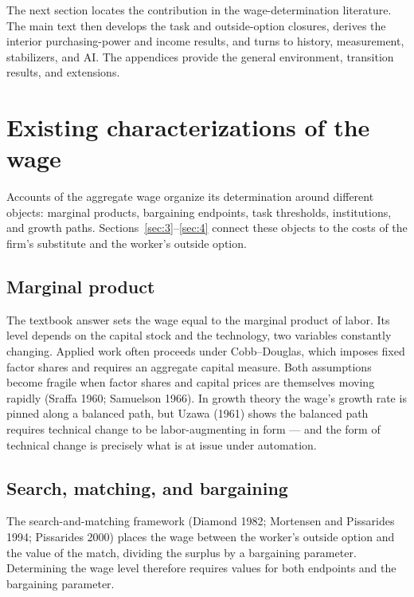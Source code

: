 \documentclass[12pt]{article}
\theoremstyle{plain}
\begin{document}
The next section locates the contribution in the wage-determination
literature. The main text then develops the task and outside-option closures,
derives the interior purchasing-power and income results, and turns to history,
measurement, stabilizers, and AI. The appendices provide the general
environment, transition results, and extensions.

\section{Existing characterizations of the wage}\label{sec:2}

Accounts of the aggregate wage organize its determination around different objects: marginal products, bargaining endpoints, task thresholds, institutions, and growth paths. Sections~\ref{sec:3}--\ref{sec:4} connect these objects to the costs of the firm's substitute and the worker's outside option.

\subsection{Marginal product}\label{sec:2.1}

The textbook answer sets the wage equal to the marginal product of labor. Its level depends on the capital stock and the technology, two variables constantly changing. Applied work often proceeds under Cobb--Douglas, which imposes fixed factor shares and requires an aggregate capital measure. Both assumptions become fragile when factor shares and capital prices are themselves moving rapidly (Sraffa 1960; Samuelson 1966). In growth theory the wage's growth rate is pinned along a balanced path, but Uzawa (1961) shows the balanced path requires technical change to be labor-augmenting in form --- and the form of technical change is precisely what is at issue under automation.

\subsection{Search, matching, and bargaining}\label{sec:2.2}

The search-and-matching framework (Diamond 1982; Mortensen and Pissarides 1994; Pissarides 2000) places the wage between the worker's outside option and the value of the match, dividing the surplus by a bargaining parameter. Determining the wage level therefore requires values for both endpoints and the bargaining parameter.
\end{document}
